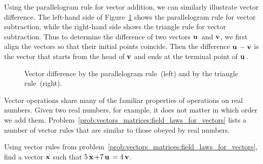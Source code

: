 Using the parallelogram rule for vector
addition, we can similarly illustrate vector difference. The left-hand
side of
Figure~\ref{fig:vectors_matrices:vector_difference_parallelogram_triangle}
shows the parallelogram rule for vector subtraction, while the
right-hand side shows the triangle rule for vector subtraction. Thus
to determine the difference of two vectors $\operatorname*{\mathbf{u}}{}$ and $\operatorname*{\mathbf{v}}$, we
first align the vectors so that their initial points coincide. Then
the difference $\operatorname*{\mathbf{u}}{} - \operatorname*{\mathbf{v}}$ is the vector that starts from the head
of $\operatorname*{\mathbf{v}}$ and ends at the terminal point of $\operatorname*{\mathbf{u}}{}$.

\begin{figure}[!htpb]
\centering
{}
\caption{Vector difference by the parallelogram rule~(left) and by the
triangle rule~(right).}
\label{fig:vectors_matrices:vector_difference_parallelogram_triangle}
\end{figure}

Vector operations share many of the familiar properties of operations
on real numbers. Given two real numbers, for example, it does not
matter in which order we add
them. Problem~\ref{prob:vectors_matrices:field_laws_for_vectors} lists
a number of vector rules that are similar to those obeyed by real numbers.

\begin{example}
Using vector rules from
problem~\ref{prob:vectors_matrices:field_laws_for_vectors}, find a
vector $\operatorname*{\mathbf{x}}$ such that $5\operatorname*{\mathbf{x}} + 7\operatorname*{\mathbf{u}}{} = 4\operatorname*{\mathbf{v}}$.
\end{example}

